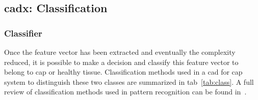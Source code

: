 \subsection{\ac{cadx}: Classification} \label{subsec:classification}

\subsubsection{Classifier}

Once the feature vector has been extracted and eventually the complexity reduced, it is possible to make a decision and classify this feature vector to belong to \ac{cap} or healthy tissue. Classification methods used in a \ac{cad} for \ac{cap} system to distinguish these two classes are summarized in \ac{tab}~\ref{tab:class}. A full review of classification methods used in pattern recognition can be found in~\cite{Bishop2006}.


